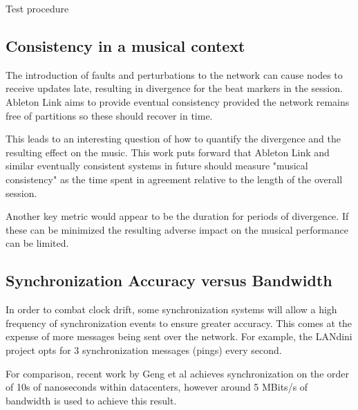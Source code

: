 \documentclass[11pt]{article} %
\theoremstyle{plain}
\theoremstyle{definition}
\begin{document}
\makeatletter
\def\BState{\State\hskip-\ALG@thistlm}
\makeatother

\begin{algorithm}
  \caption{Test procedure}\label{linktest}
\end{algorithm}

\subsection{Consistency in a musical context}

The introduction of faults and perturbations to the network can cause nodes to
receive updates late, resulting in divergence for the beat markers in the
session. Ableton Link aims to provide eventual
consistency\cite{vogels2009eventually} provided the network remains free of
partitions so these should recover in time.

This leads to an interesting question of how to quantify the divergence and the
resulting effect on the music. This work puts forward that Ableton Link and
similar eventually consistent systems in future should measure "musical
consistency" as the time spent in agreement relative to the length of the
overall session.

Another key metric would appear to be the duration for periods of divergence.
If these can be minimized the resulting adverse impact on the musical
performance can be limited.

\subsection{Synchronization Accuracy versus Bandwidth}

In order to combat clock drift, some synchronization systems will allow a high
frequency of synchronization events to ensure greater accuracy. This comes at
the expense of more messages being sent over the network. For example, the
LANdini project opts for 3 synchronization messages (pings) every second.

For comparison, recent work by Geng et al\cite{geng2018} achieves
synchronization on the order of 10s of nanoseconds within datacenters, however
around 5 MBits/s of bandwidth is used to achieve this result.
\end{document}
